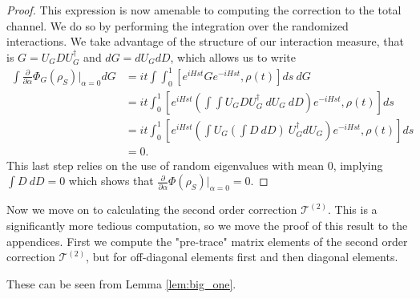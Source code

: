 \documentclass{article}
\newcommand{\parens}[1]{\left( #1 \right)}
\begin{document}
\begin{proof}
    This expression is now amenable to computing the correction to the total channel. We do so by performing the integration over the randomized interactions. We take advantage of the structure of our interaction measure, that is $G = U_G D U_G^\dagger$ and $dG = dU_G dD$, which allows us to write
    \begin{align}
        \int \frac{\partial}{\partial \alpha} \Phi_G(\rho_S) \bigg|_{\alpha = 0} dG &= it \int \int_0^1 \left[ e^{i H s t} G e^{-i H s t}, \rho(t) \right] ds ~dG \\
        &= it \int_0^1 \left[ e^{i H s t} \parens{\int \int U_G D U_G^\dagger ~dU_G ~ dD} e^{-i H s t}, \rho(t)  \right] ds \\
        &= i t \int_0^1 \left[ e^{i H s t} \parens{\int U_G \parens{\int D ~ dD} ~ U_G^\dagger dU_G } e^{-i H s t}, \rho(t) \right] ds \\
        &= 0.
    \end{align}
    This last step relies on the use of random eigenvalues with mean 0, implying $\int D ~dD = 0$ which shows that $\frac{\partial}{\partial \alpha} \Phi(\rho_S) \big|_{\alpha = 0 } = 0$.
\end{proof}

Now we move on to calculating the second order correction $\mathcal{T}^{(2)}$. This is a significantly more tedious computation, so we move the proof of this result to the appendices. First we compute the "pre-trace" matrix elements of the second order correction $\mathcal{T}^{(2)}$, but for off-diagonal elements first and then diagonal elements.

These can be seen from Lemma \ref{lem:big_one}.
\end{document}
